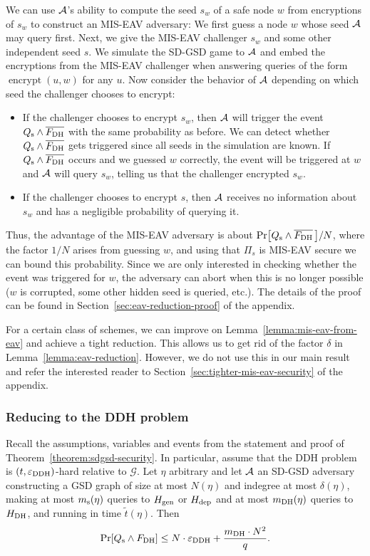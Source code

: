 We can use $\mathcal{A}$'s ability to compute the seed $s_w$ of a safe node $w$ from encryptions of $s_w$ to construct an MIS-EAV adversary: We first guess a node $w$ whose seed $\mathcal{A}$ may query first. Next, we give the MIS-EAV challenger $s_w$ and some other independent seed $s$. We simulate the SD-GSD game to $\mathcal{A}$ and embed the encryptions from the MIS-EAV challenger when answering queries of the form $\operatorname{encrypt}(u, w)$ for any $u$. Now consider the behavior of $\mathcal{A}$ depending on which seed the challenger chooses to encrypt:
\begin{itemize}
	\item If the challenger chooses to encrypt $s_w$, then $\mathcal{A}$ will trigger the event $Q_\mathrm{s} \land \overline{F_\mathrm{DH}}$ with the same probability as before. We can detect whether $Q_\mathrm{s} \land \overline{F_\mathrm{DH}}$ gets triggered since all seeds in the simulation are known. If $Q_\mathrm{s} \land \overline{F_\mathrm{DH}}$ occurs and we guessed $w$ correctly, the event will be triggered at $w$ and $\mathcal{A}$ will query $s_w$, telling us that the challenger encrypted $s_w$.
	\item If the challenger chooses to encrypt $s$, then $\mathcal{A}$ receives no information about $s_w$ and has a negligible probability of querying it.
\end{itemize}
Thus, the advantage of the MIS-EAV adversary is about $\pr{\qs \land \overline{\fdh}\,}/N$, where the factor $1/N$ arises from guessing $w$, and using that $\Pi_s$ is MIS-EAV secure we can bound this probability. Since we are only interested in checking whether the event was triggered for $w$, the adversary can abort when this is no longer possible ($w$ is corrupted, some other hidden seed is queried, etc.). The details of the proof can be found in Section~\ref{sec:eav-reduction-proof} of the appendix.

For a certain class of schemes, we can improve on Lemma~\ref{lemma:mis-eav-from-eav} and achieve a tight reduction. This allows us to get rid of the factor $\delta$ in Lemma~\ref{lemma:eav-reduction}. However, we do not use this in our main result and refer the interested reader to Section~\ref{sec:tighter-mis-eav-security} of the appendix.

\subsubsection{Reducing to the DDH problem}

\begin{lemma} \label{lemma:dh-reduction}
	Recall the assumptions, variables and events from the statement and proof of Theorem~\ref{theorem:sdgsd-security}. In particular, assume that the DDH problem is $(t, \varepsilon_\mathrm{DDH})$-hard relative to $\mathcal{G}$. Let $\eta$ arbitrary and let $\mathcal{A}$ an SD-GSD adversary constructing a GSD graph of size at most $N(\eta)$ and indegree at most $\delta(\eta)$, making at most $m_\mathrm{s}(\eta)$ queries to $H_\mathrm{gen}$ or $H_\mathrm{dep}$ and at most $m_\mathrm{DH}(\eta)$ queries to $H_\mathrm{DH}$, and running in time $\tilde{t}(\eta)$. Then
	\[
		\pr{\qs \land \fdh} \le N \cdot \eddh + \frac{\mdh \cdot N^2}{q}.
	\]
\end{lemma}

